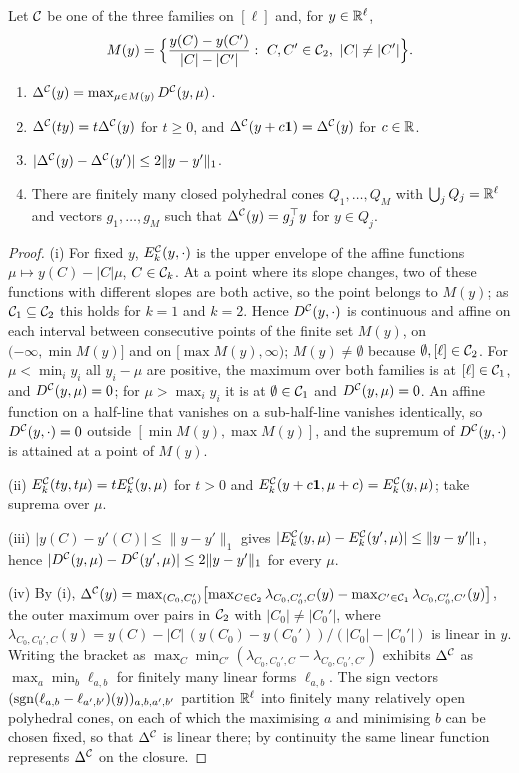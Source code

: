 \begin{lemma}\label{lem:S-pl}
Let $\mathcal{C}$ be one of the three families on $[\ell]$ and, for $y\in\mathbb{R}^\ell$,
\[
M(y)=\Bigl\{\frac{y(C)-y(C')}{|C|-|C'|}:\ C,C'\in\cC_2,\ |C|\ne|C'|\Bigr\}.
\]
\begin{enumerate}
\item[(i)] $\Delta^{\mathcal{C}}(y)=\max_{\mu\in M(y)}D^{\mathcal{C}}(y,\mu)$.
\item[(ii)] $\Delta^{\mathcal{C}}(ty)=t\Delta^{\mathcal{C}}(y)$ for $t\ge0$, and $\Delta^{\mathcal{C}}(y+c\mathbf{1})=\Delta^{\mathcal{C}}(y)$ for $c\in\mathbb{R}$.
\item[(iii)] $|\Delta^{\mathcal{C}}(y)-\Delta^{\mathcal{C}}(y')|\le2\|y-y'\|_1$.
\item[(iv)] There are finitely many closed polyhedral cones $Q_1,\dots,Q_M$ with $\bigcup_jQ_j=\mathbb{R}^\ell$ and vectors $g_1,\dots,g_M$ such that $\Delta^{\mathcal{C}}(y)=g_j^\top y$ for $y\in Q_j$.
\end{enumerate}
\end{lemma}

\begin{proof}
(i) For fixed $y$, $E^{\mathcal{C}}_k(y,\cdot)$ is the upper envelope of the affine functions $\mu\mapsto y(C)-|C|\mu$, $C\in\mathcal{C}_k$. At a point where its slope changes, two of these functions with different slopes are both active, so the point belongs to $M(y)$; as $\mathcal{C}_1\subseteq\mathcal{C}_2$ this holds for $k=1$ and $k=2$. Hence $D^{\mathcal{C}}(y,\cdot)$ is continuous and affine on each interval between consecutive points of the finite set $M(y)$, on $(-\infty,\min M(y)]$ and on $[\max M(y),\infty)$; $M(y)\ne\emptyset$ because $\emptyset,[\ell]\in\mathcal{C}_2$. For $\mu<\min_iy_i$ all $y_i-\mu$ are positive, the maximum over both families is at $[\ell]\in\mathcal{C}_1$, and $D^{\mathcal{C}}(y,\mu)=0$; for $\mu>\max_iy_i$ it is at $\emptyset\in\mathcal{C}_1$ and $D^{\mathcal{C}}(y,\mu)=0$. An affine function on a half-line that vanishes on a sub-half-line vanishes identically, so $D^{\mathcal{C}}(y,\cdot)=0$ outside $[\min M(y),\max M(y)]$, and the supremum of $D^{\mathcal{C}}(y,\cdot)$ is attained at a point of $M(y)$.

(ii) $E^{\mathcal{C}}_k(ty,t\mu)=tE^{\mathcal{C}}_k(y,\mu)$ for $t>0$ and $E^{\mathcal{C}}_k(y+c\mathbf{1},\mu+c)=E^{\mathcal{C}}_k(y,\mu)$; take suprema over $\mu$.

(iii) $|y(C)-y'(C)|\le\|y-y'\|_1$ gives $|E^{\mathcal{C}}_k(y,\mu)-E^{\mathcal{C}}_k(y',\mu)|\le\|y-y'\|_1$, hence $|D^{\mathcal{C}}(y,\mu)-D^{\mathcal{C}}(y',\mu)|\le2\|y-y'\|_1$ for every $\mu$.

(iv) By (i), $\Delta^{\mathcal{C}}(y)=\max_{(C_0,C_0')}\bigl[\max_{C\in\mathcal{C}_2}\lambda_{C_0,C_0',C}(y)-\max_{C'\in\mathcal{C}_1}\lambda_{C_0,C_0',C'}(y)\bigr]$, the outer maximum over pairs in $\mathcal{C}_2$ with $|C_0|\ne|C_0'|$, where $\lambda_{C_0,C_0',C}(y)=y(C)-|C|\,(y(C_0)-y(C_0'))/(|C_0|-|C_0'|)$ is linear in $y$. Writing the bracket as $\max_{C}\min_{C'}(\lambda_{C_0,C_0',C}-\lambda_{C_0,C_0',C'})$ exhibits $\Delta^{\mathcal{C}}$ as $\max_a\min_b\ell_{a,b}$ for finitely many linear forms $\ell_{a,b}$. The sign vectors $(\operatorname{sgn}(\ell_{a,b}-\ell_{a',b'})(y))_{a,b,a',b'}$ partition $\mathbb{R}^\ell$ into finitely many relatively open polyhedral cones, on each of which the maximising $a$ and minimising $b$ can be chosen fixed, so that $\Delta^{\mathcal{C}}$ is linear there; by continuity the same linear function represents $\Delta^{\mathcal{C}}$ on the closure.
\end{proof}

